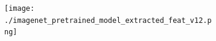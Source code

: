 \documentclass[letterpaper]{article} %
\begin{document}
\begin{figure}[t]
\centering
\begin{subfigure}{0.36\textwidth}
\centering
\texttt{[image: ./imagenet\_pretrained\_model\_extracted\_feat\_v12.png]}
\caption{}
\end{subfigure}
\\
\begin{subfigure}{0.144\textwidth}
\centering
{}
\caption{}
\end{subfigure}
\quad
\begin{subfigure}{0.117\textwidth}
\centering
{}

\end{subfigure}
\end{figure}
\end{document}
